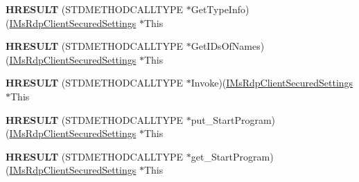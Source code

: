 \begin{DoxyCompactItemize}
\item 
\mbox{\label{struct_m_s_t_s_c_lib_1_1_i_ms_rdp_client_secured_settings_vtbl_a2c56eda7508e1a896471cc9678da0e08}} 
{\bfseries H\+R\+E\+S\+U\+LT} (S\+T\+D\+M\+E\+T\+H\+O\+D\+C\+A\+L\+L\+T\+Y\+PE $\ast$Get\+Type\+Info)(\hyperlink{interface_m_s_t_s_c_lib_1_1_i_ms_rdp_client_secured_settings}{I\+Ms\+Rdp\+Client\+Secured\+Settings} $\ast$This
\item 
\mbox{\label{struct_m_s_t_s_c_lib_1_1_i_ms_rdp_client_secured_settings_vtbl_a783e64ad425e3691d2d571dac942ce29}} 
{\bfseries H\+R\+E\+S\+U\+LT} (S\+T\+D\+M\+E\+T\+H\+O\+D\+C\+A\+L\+L\+T\+Y\+PE $\ast$Get\+I\+Ds\+Of\+Names)(\hyperlink{interface_m_s_t_s_c_lib_1_1_i_ms_rdp_client_secured_settings}{I\+Ms\+Rdp\+Client\+Secured\+Settings} $\ast$This
\item 
\mbox{\label{struct_m_s_t_s_c_lib_1_1_i_ms_rdp_client_secured_settings_vtbl_a9b4732aa824a7973a97ae908df0a4fb9}} 
{\bfseries H\+R\+E\+S\+U\+LT} (S\+T\+D\+M\+E\+T\+H\+O\+D\+C\+A\+L\+L\+T\+Y\+PE $\ast$Invoke)(\hyperlink{interface_m_s_t_s_c_lib_1_1_i_ms_rdp_client_secured_settings}{I\+Ms\+Rdp\+Client\+Secured\+Settings} $\ast$This
\item 
\mbox{\label{struct_m_s_t_s_c_lib_1_1_i_ms_rdp_client_secured_settings_vtbl_a1a2d90c248a61ffcb7f46dbf9e7fcaee}} 
{\bfseries H\+R\+E\+S\+U\+LT} (S\+T\+D\+M\+E\+T\+H\+O\+D\+C\+A\+L\+L\+T\+Y\+PE $\ast$put\+\_\+\+Start\+Program)(\hyperlink{interface_m_s_t_s_c_lib_1_1_i_ms_rdp_client_secured_settings}{I\+Ms\+Rdp\+Client\+Secured\+Settings} $\ast$This
\item 
\mbox{\label{struct_m_s_t_s_c_lib_1_1_i_ms_rdp_client_secured_settings_vtbl_ae4475fd2c4a41fbea38dd665cade9733}} 
{\bfseries H\+R\+E\+S\+U\+LT} (S\+T\+D\+M\+E\+T\+H\+O\+D\+C\+A\+L\+L\+T\+Y\+PE $\ast$get\+\_\+\+Start\+Program)(\hyperlink{interface_m_s_t_s_c_lib_1_1_i_ms_rdp_client_secured_settings}{I\+Ms\+Rdp\+Client\+Secured\+Settings} $\ast$This
\item 
\mbox{\label{struct_m_s_t_s_c_lib_1_1_i_ms_rdp_client_secured_settings_vtbl_af99458ae82b40df64a7434a81122c842}} 

\end{DoxyCompactItemize}

